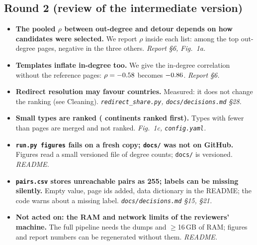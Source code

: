 \documentclass[10pt,a4paper]{article}
\newcommand{\fb}[3]{\item \textbf{#1} #2 \emph{#3}}
\begin{document}
\subsection*{Round 2 (review of the intermediate version)}
\begin{itemize}
\fb{The pooled $\rho$ between out-degree and detour depends on how candidates were selected.}{We
report $\rho$ inside each list: \RhoOutDetourInGrpOut{} among the top out-degree pages, negative
in the three others.}{Report §6, Fig.~1a.}
\fb{Templates inflate in-degree too.}{We give the in-degree correlation without the
\NReferenceCandidates{} reference pages: $\rho=-0.58$ becomes $-0.86$.}{Report §6.}
\fb{Redirect resolution may favour countries.}{Measured: it does not change the ranking (see
Cleaning).}{\texttt{redirect\_share.py}, \texttt{docs/decisions.md} §28.}\fb{Small types are ranked (\TypeContinentN{} continents ranked first).}{Types with fewer than \MinTypeSize{}
pages are merged and not ranked.}{Fig.~1c, \texttt{config.yaml}.}
\fb{\texttt{run.py figures} fails on a fresh copy; \texttt{docs/} was not on GitHub.}{Figures
read a small versioned file of degree counts; \texttt{docs/} is versioned.}{README.}
\fb{\texttt{pairs.csv} stores unreachable pairs as 255; labels can be missing silently.}{Empty
value, page ids added, data dictionary in the README; the code warns about a missing label.}
{\texttt{docs/decisions.md} §15, §21.}
\fb{Not acted on: the RAM and network limits of the reviewers' machine.}{The full pipeline needs
the dumps and $\geq$16\,GB of RAM; figures and report numbers can be regenerated without
them.}{README.}
\end{itemize}
\end{document}
